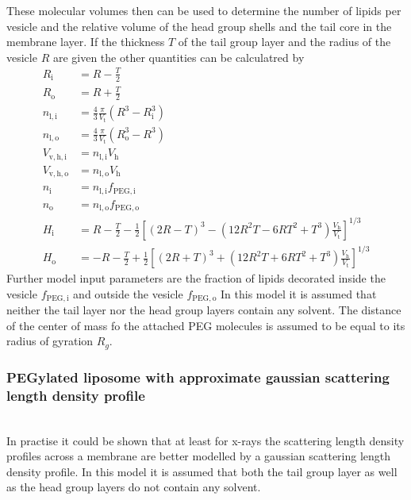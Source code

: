 These molecular volumes then can be used to determine the number of lipids per vesicle and the relative volume of the head group shells and the tail core in the membrane layer. If the thickness $T$ of the tail group layer and the radius of the vesicle $R$ are given the other quantities can be calculatred by
\begin{align}
R_\mathrm{i} &= R-\frac T2 \\
R_\mathrm{o} &= R+\frac T2 \\
n_\mathrm{l,i} &= \frac43 \frac{\pi}{V_\mathrm{t}} \left(R^3-R_\mathrm{i}^3\right) \\
n_\mathrm{l,o} &= \frac43 \frac{\pi}{V_\mathrm{t}} \left(R_\mathrm{o}^3-R^3\right) \\
V_\mathrm{v,h,i} &= n_\mathrm{l,i} V_\mathrm{h} \\
V_\mathrm{v,h,o} &= n_\mathrm{l,o} V_\mathrm{h} \\
n_\mathrm{i} &= n_\mathrm{l,i} f_\mathrm{PEG,i} \\
n_\mathrm{o} &= n_\mathrm{l,o} f_\mathrm{PEG,o} \\
H_\mathrm{i} & =  R - \frac T2 - \frac12 \left[\left(2R-T\right)^3 - \left(12R^2T-6RT^2+T^3\right)\frac{V_\mathrm{h}}{V_\mathrm{t}}\right]^{1/3} \\
H_\mathrm{o} & = -R - \frac T2 + \frac12 \left[\left(2R+T\right)^3 + \left(12R^2T+6RT^2+T^3\right)\frac{V_\mathrm{h}}{V_\mathrm{t}}\right]^{1/3}
\end{align}
Further model input parameters are the fraction of lipids decorated inside the vesicle $f_\mathrm{PEG,i}$ and outside the vesicle  $f_\mathrm{PEG,o}$
In this model it is assumed that neither the tail layer nor the head group layers contain any solvent. The distance of the center of mass fo the attached PEG molecules is assumed to be equal to its radius of gyration $R_g$.
~\\
\subsubsection{PEGylated liposome with approximate gaussian scattering length density profile} ~\\

In practise it could be shown \cite{Pabst2002,Brzustowicz2005} that at least for x-rays the scattering length density profiles across a membrane are better modelled by a gaussian scattering length density profile. In this model it is assumed that both the tail group layer as well as the head group layers do not contain any solvent. 